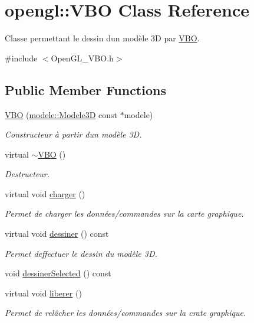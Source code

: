 \hypertarget{classopengl_1_1_v_b_o}{}\section{opengl\+:\+:V\+B\+O Class Reference}
\label{classopengl_1_1_v_b_o}


Classe permettant le dessin d\textquotesingle{}un modèle 3\+D par \hyperlink{classopengl_1_1_v_b_o}{V\+B\+O}.  




{\ttfamily \#include $<$Open\+G\+L\+\_\+\+V\+B\+O.\+h$>$}

\subsection*{Public Member Functions}
\begin{DoxyCompactItemize}
\item 
\hyperlink{group__modele_ga6fa9de06cf295f987e2022162f1c0d41}{V\+B\+O} (\hyperlink{classmodele_1_1_modele3_d}{modele\+::\+Modele3\+D} const $\ast$modele)
\begin{DoxyCompactList}\small\item\em Constructeur à partir d\textquotesingle{}un modèle 3\+D. \end{DoxyCompactList}\item 
virtual \hyperlink{group__modele_gafcea85cfc425d9c4720a32a53b720783}{$\sim$\+V\+B\+O} ()
\begin{DoxyCompactList}\small\item\em Destructeur. \end{DoxyCompactList}\item 
virtual void \hyperlink{group__modele_gacecd4cf0a91c2b8b34c193f7801d42ea}{charger} ()
\begin{DoxyCompactList}\small\item\em Permet de charger les données/commandes sur la carte graphique. \end{DoxyCompactList}\item 
virtual void \hyperlink{group__modele_ga41350c248ef222b9cbfb850432abbc53}{dessiner} () const 
\begin{DoxyCompactList}\small\item\em Permet d\textquotesingle{}effectuer le dessin du modèle 3\+D. \end{DoxyCompactList}\item 
void \hyperlink{group__modele_ga17f25b54d1a61772cf3a3f88a3ce6274}{dessiner\+Selected} () const 
\item 
virtual void \hyperlink{group__modele_ga6fd3c8634c2da6d9460aa5d118ac47cd}{liberer} ()
\begin{DoxyCompactList}\small\item\em Permet de relâcher les données/commandes sur la crate graphique. \end{DoxyCompactList}\end{DoxyCompactItemize}


